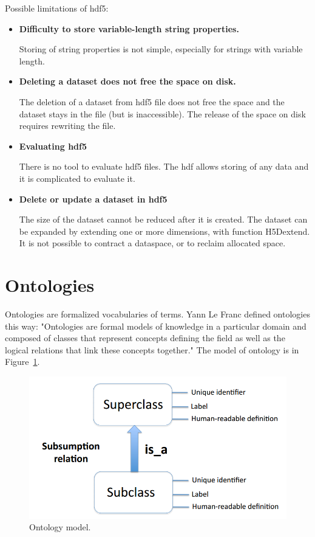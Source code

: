 Possible limitations of \gls{hdf5}: \cite{neurohdf}
\begin{itemize}
	\item \textbf{Difficulty to store variable-length string properties.}
	
	Storing of string properties is not simple, especially for strings with variable length.
	\item \textbf{Deleting a dataset does not free the space on disk.}
	
	The deletion of a dataset from \gls{hdf5} file does not free the space and the dataset stays in the file (but is inaccessible). The release of the space on disk requires rewriting the file.

	\item \textbf{Evaluating \gls{hdf5}}
	
	There is no tool to evaluate \gls{hdf5} files. The \gls{hdf} allows storing of any data and it is complicated to evaluate it.
	\item \textbf{Delete or update a dataset in \gls{hdf5}} 
	
	The size of the dataset cannot be reduced after it is created. The dataset can be expanded by extending one or more dimensions, with function H5Dextend. It is not possible to contract a dataspace, or to reclaim allocated space.
\end{itemize}

\section{Ontologies}

Ontologies are formalized vocabularies of terms. Yann Le Franc defined ontologies this way: "Ontologies are formal models of knowledge in a particular domain and composed of classes that represent concepts defining the field as well as the logical relations that link these concepts together." \cite{ontology} The model of ontology is in Figure~\ref{ontology_scheme}.

\begin{figure}
	\centering
	\includegraphics[scale=0.5]{obrazky/ontology.png}
	\caption{Ontology model. \cite{ontology}}
	\label{ontology_scheme}
\end{figure}

